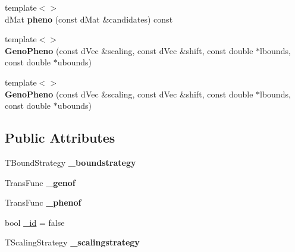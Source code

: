 \begin{DoxyCompactItemize}
\item 
\hypertarget{classlibcmaes_1_1GenoPheno_a7bea30d3dcae75600b5f30c616c55ef2}{{\footnotesize template$<$$>$ }\\d\-Mat {\bfseries pheno} (const d\-Mat \&candidates) const}\label{classlibcmaes_1_1GenoPheno_a7bea30d3dcae75600b5f30c616c55ef2}

\item 
\hypertarget{classlibcmaes_1_1GenoPheno_adbe3631f81843ff59d935fe7551a954f}{{\footnotesize template$<$$>$ }\\{\bfseries Geno\-Pheno} (const d\-Vec \&scaling, const d\-Vec \&shift, const double $\ast$lbounds, const double $\ast$ubounds)}\label{classlibcmaes_1_1GenoPheno_adbe3631f81843ff59d935fe7551a954f}

\item 
\hypertarget{classlibcmaes_1_1GenoPheno_a290b5770f19f5fe1f70cb60280c8a5b3}{{\footnotesize template$<$$>$ }\\{\bfseries Geno\-Pheno} (const d\-Vec \&scaling, const d\-Vec \&shift, const double $\ast$lbounds, const double $\ast$ubounds)}\label{classlibcmaes_1_1GenoPheno_a290b5770f19f5fe1f70cb60280c8a5b3}

\end{DoxyCompactItemize}
\subsection*{Public Attributes}
\begin{DoxyCompactItemize}
\item 
\hypertarget{classlibcmaes_1_1GenoPheno_adea08b723e8e45cd0272ac7e9a8f10b7}{T\-Bound\-Strategy {\bfseries \-\_\-boundstrategy}}\label{classlibcmaes_1_1GenoPheno_adea08b723e8e45cd0272ac7e9a8f10b7}

\item 
\hypertarget{classlibcmaes_1_1GenoPheno_a0f9e0d81e14f19cd3aaa7e899197af06}{Trans\-Func {\bfseries \-\_\-genof}}\label{classlibcmaes_1_1GenoPheno_a0f9e0d81e14f19cd3aaa7e899197af06}

\item 
\hypertarget{classlibcmaes_1_1GenoPheno_a3a25e83891a647965b05a1f785b79a0d}{Trans\-Func {\bfseries \-\_\-phenof}}\label{classlibcmaes_1_1GenoPheno_a3a25e83891a647965b05a1f785b79a0d}

\item 
bool \hyperlink{classlibcmaes_1_1GenoPheno_a44ec792f07e3457773e72a3d389d393c}{\-\_\-id} = false
\item 
\hypertarget{classlibcmaes_1_1GenoPheno_a61c4ac8416aee38f824aded267ca0268}{T\-Scaling\-Strategy {\bfseries \-\_\-scalingstrategy}}\label{classlibcmaes_1_1GenoPheno_a61c4ac8416aee38f824aded267ca0268}

\end{DoxyCompactItemize}


